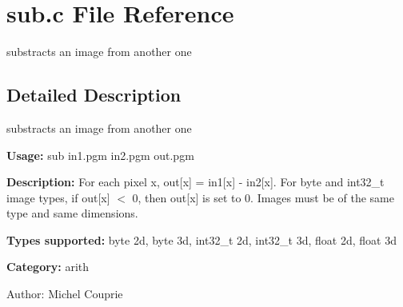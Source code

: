\section{sub.c File Reference}
\label{sub_8c}
substracts an image from another one  




\label{_details}
\subsection{Detailed Description}
substracts an image from another one 

{\bf Usage:} sub in1.pgm in2.pgm out.pgm

{\bf Description:} For each pixel x, out[x] = in1[x] - in2[x]. For byte and int32\_\-t image types, if out[x] $<$ 0, then out[x] is set to 0. Images must be of the same type and same dimensions.

{\bf Types supported:} byte 2d, byte 3d, int32\_\-t 2d, int32\_\-t 3d, float 2d, float 3d

{\bf Category:} arith

\begin{Desc}
\item[Author:]Michel Couprie \end{Desc}
